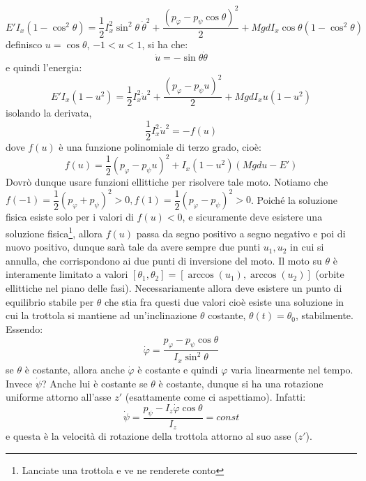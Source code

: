 \documentclass[a4paper,openany]{article}
\begin{document}
	$$
	E'I_x(1-\cos^2\theta) = \dfrac{1}{2}I_x^{2}\sin^2\theta\>\dot{\theta}^{2}+ \dfrac{(p_{\varphi}- p_{\psi}\cos\theta)^2}{2} + MgdI_x\cos\theta(1-\cos^2\theta) 
	$$
	definisco $u = \cos\theta$, $-1<u<1$, si ha che:
	$$
	\dot{u} = -\sin\theta \dot{\theta}
	$$
	e quindi l'energia:
	$$
	E'I_x(1-u^2) = \dfrac{1}{2}I_x^{2}\dot{u}^{2}+ \dfrac{(p_{\varphi}- p_{\psi}u)^2}{2} + MgdI_x u (1-u^2) 
	$$
	isolando la derivata,
	$$
	\dfrac{1}{2}I_x^{2} \dot{u}^2 = -f(u)
	$$
	dove $f(u)$ è una funzione polinomiale di terzo grado, cioè:
	$$
	f(u) = \dfrac{1}{2}(p_{\varphi}-p_{\psi}u)^2 + I_x(1-u^2)(Mgdu - E')
	$$
	Dovrò dunque usare funzioni ellittiche per risolvere tale moto. Notiamo che $f(-1) = \dfrac{1}{2}(p_{\varphi}+p_{\psi})^2 > 0, f(1) = \dfrac{1}{2}(p_{\varphi}-p_{\psi})^2 > 0$. Poiché la soluzione fisica esiste solo per i valori di $f(u)<0$, e sicuramente deve esistere una soluzione fisica\footnote{Lanciate una trottola e ve ne renderete conto}, allora $f(u)$ passa da segno positivo a segno negativo e poi di nuovo positivo, dunque sarà tale da avere sempre due punti $u_1,u_2$ in cui si annulla, che corrispondono ai due punti di inversione del moto. Il moto su $\theta$ è interamente limitato a valori $[\theta_1,\theta_2] = [\arccos(u_1),\arccos(u_2)]$ (orbite ellittiche nel piano delle fasi). Necessariamente allora deve esistere un punto di equilibrio stabile per $\theta$ che stia fra questi due valori cioè esiste una soluzione in cui la trottola si mantiene ad un'inclinazione $\theta$ costante, $\theta(t) = \theta_0$, stabilmente. Essendo:
	\begin{equation}
		\dot{\varphi} = \dfrac{p_{\varphi}-p_{\psi}\cos\theta}{I_x \sin^2\theta}
		\label{phidot}
	\end{equation}
	se $\theta$ è costante, allora anche $\dot\varphi$ è costante e quindi $\varphi$ varia linearmente nel tempo. Invece $\dot{\psi}$? Anche lui è costante se $\theta$ è costante, dunque si ha una rotazione uniforme attorno all'asse $z'$ (esattamente come ci aspettiamo). Infatti:
	$$
	\dot{\psi}= \dfrac{p_\psi - I_z\dot{\varphi}\cos\theta}{I_z} = const
	$$
	e questa è la velocità di rotazione della trottola attorno al suo asse ($z'$).
	
	
	
\end{document}
